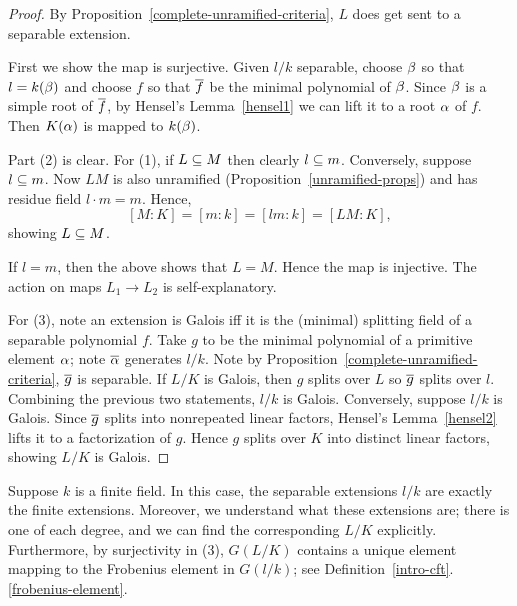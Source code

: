 \begin{proof}
By Proposition~\ref{complete-unramified-criteria}, $L$ does get sent to a separable extension.

First we show the map is surjective. Given $l/k$ separable, choose $\beta$ so that $l=k(\beta)$ and choose $f$ so that $\overline{f}$ be the minimal polynomial of $\beta$. Since $\beta$ is a simple root of $\overline{f}$, by Hensel's Lemma~\ref{hensel1} we can lift it to a root $\alpha$ of $f$. Then $K(\alpha)$ is mapped to $k(\beta)$.

Part (2) is clear. For (1), if $L\subseteq M$ then clearly $l\subseteq m$. Conversely, suppose $l\subseteq m$. 
Now $LM$ is also unramified (Proposition~\ref{unramified-props}) and has residue field $l\cdot m=m$. Hence,
\[
[M:K]=[m:k]=[lm:k]=[LM:K],
\] 
showing $L\subseteq M$.

If $l=m$, then the above shows that $L=M$. Hence the map is injective. The action on maps $L_1\to L_2$ is self-explanatory.

For (3), note an extension is Galois iff it is the (minimal) splitting field of a separable polynomial $f$. Take $g$ to be the minimal polynomial of a primitive element $\alpha$; note $\overline{\alpha}$ generates $l/k$. 
Note by Proposition~\ref{complete-unramified-criteria}, $\overline{g}$ is separable. 
If $L/K$ is Galois, then $g$ splits over $L$ so %
$\overline{g}$ splits over $l$. Combining the previous two statements, $l/k$ is Galois.
Conversely, suppose $l/k$ is Galois. Since $\overline{g}$ splits into nonrepeated linear factors, Hensel's Lemma~\ref{hensel2} lifts it to a factorization of $g$. Hence $g$ splits over $K$ into distinct linear factors, showing $L/K$ is Galois.
\end{proof}
Suppose $k$ is a finite field. In this case, the separable extensions $l/k$ are exactly the finite extensions. Moreover, we understand what these extensions are; there is one of each degree, and we can find the corresponding $L/K$ explicitly. Furthermore, by surjectivity in (3), $G(L/K)$ contains a unique element mapping to the Frobenius element in $G(l/k)$; see Definition~\ref{intro-cft}.\ref{frobenius-element}.
